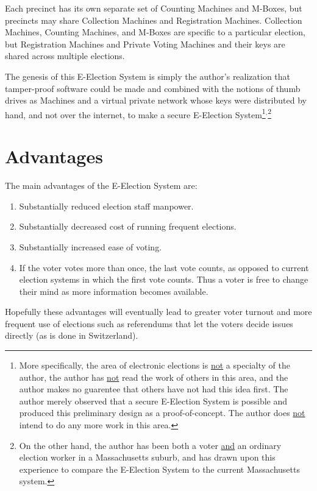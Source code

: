 \documentclass[12pt]{article}
\begin{document}
Each precinct has its own separate set of Counting Machines and M-Boxes,
but precincts may share Collection Machines and Registration
Machines.  Collection Machines,
Counting Machines, and M-Boxes are
specific to a particular election, but Registration Machines
and Private Voting Machines and
their keys are shared across multiple elections.

The genesis of this E-Election System is simply the author's
realization that tamper-proof software could be made and
combined with the notions of thumb drives as Machines and
a virtual private network whose keys were distributed by
hand, and not over the internet, to make a secure E-Election
System\footnote{More specifically, the area of electronic
elections is \underline{not} a specialty of the author, the
author has \underline{not} read the work of others in this
area, and the author makes no guarentee that others have not had
this idea first.  The author merely observed that a secure
E-Election System is possible and produced this preliminary
design as a proof-of-concept.
The author does \underline{not} intend to do any more work in this
area.}$^,$\footnote{On the other hand, the author has been both a voter
\underline{and}
an ordinary election worker in a Massachusetts suburb,
and has drawn upon this experience to compare the E-Election System
to the current Massachusetts system.}

\section{Advantages}

The main advantages of the E-Election System are:
\begin{enumerate}
\item Substantially reduced election staff manpower.
\item Substantially decreased cost of running frequent elections.
\item Substantially increased ease of voting.
\item If the voter votes more than once, the last vote counts,
      as opposed to current election systems in which the first vote counts.
      Thus a voter is free to change their mind as more information
      becomes available.
\end{enumerate}

Hopefully these advantages will eventually lead to
greater voter turnout and more frequent use of elections such
as referendums that let the voters decide issues directly
(as is done in Switzerland).
\end{document}
